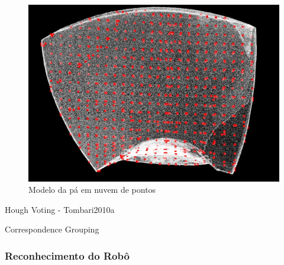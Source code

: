 \begin{figure}[h!]
   \centering
   \includegraphics[width=0.95\columnwidth]{figs/localizacao/pa_key}
   \caption{Modelo da pá em nuvem de pontos}
   \label{fig::pa_key}
\end{figure}


Hough Voting - Tombari2010a
			  
			  
Correspondence Grouping




\subsubsection{Reconhecimento do Robô}